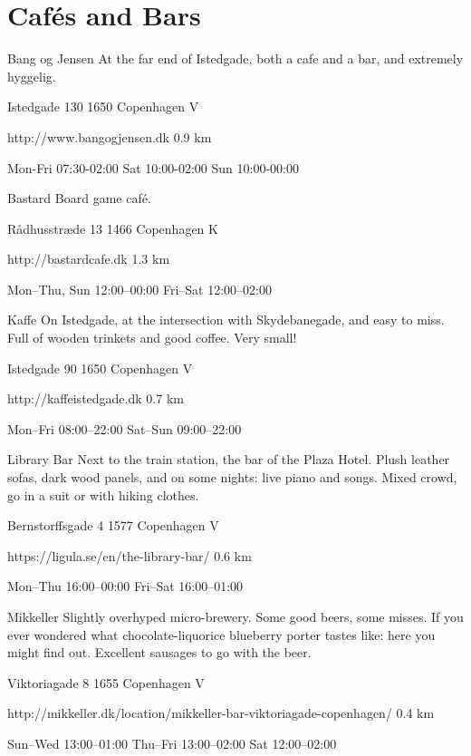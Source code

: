\section{Cafés and Bars}

\begin{fooditem}
{Bang og Jensen}
{At the far end of Istedgade, both a cafe and a bar, and extremely hyggelig.}
{\begin{addr}
{Istedgade 130}
{1650 Copenhagen V}
\end{addr}}
{http://www.bangogjensen.dk}
{0.9 km}
{}
{\begin{ohours}
{Mon-Fri}
{07:30-02:00}
{Sat}
{10:00-02:00}
{Sun}
{10:00-00:00}
{}
{}
\end{ohours}}
\end{fooditem}
\begin{fooditem}
{Bastard}
{Board game café.}
{\begin{addr}
{Rådhusstræde 13}
{1466 Copenhagen K}
\end{addr}}
{http://bastardcafe.dk }
{1.3 km}
{}
{\begin{ohours}
{Mon–Thu, Sun}
{12:00–00:00}
{Fri–Sat}
{12:00–02:00}
{}
{}
{}
{}
\end{ohours}}
\end{fooditem}
\begin{fooditem}
{Kaffe}
{On Istedgade, at the intersection with Skydebanegade, and easy to miss. Full of wooden trinkets and good coffee. Very small!}
{\begin{addr}
{Istedgade 90}
{1650 Copenhagen V}
\end{addr}}
{http://kaffeistedgade.dk}
{0.7 km}
{}
{\begin{ohours}
{Mon–Fri}
{08:00–22:00}
{Sat–Sun}
{09:00–22:00}
{}
{}
{}
{}
\end{ohours}}
\end{fooditem}
\begin{fooditem}
{Library Bar}
{Next to the train station, the bar of the Plaza Hotel. Plush leather sofas, dark wood panels, and on some nights: live piano and songs. Mixed crowd, go in a suit or with hiking clothes.}
{\begin{addr}
{Bernstorffsgade 4}
{1577 Copenhagen V}
\end{addr}}
{https://ligula.se/en/the-library-bar/}
{0.6 km}
{}
{\begin{ohours}
{Mon–Thu}
{16:00–00:00}
{Fri–Sat}
{16:00–01:00}
{}
{}
{}
{}
\end{ohours}}
\end{fooditem}
\begin{fooditem}
{Mikkeller}
{Slightly overhyped micro-brewery. Some good beers, some misses. If you ever wondered what chocolate-liquorice blueberry porter tastes like: here you might find out. Excellent sausages to go with the beer.}
{\begin{addr}
{Viktoriagade 8}
{1655 Copenhagen V}
\end{addr}}
{http://mikkeller.dk/location/mikkeller-bar-viktoriagade-copenhagen/}
{0.4 km}
{}
{\begin{ohours}
{Sun–Wed}
{13:00–01:00}
{Thu–Fri}
{13:00–02:00}
{Sat}
{12:00–02:00}
{}
{}
\end{ohours}}
\end{fooditem}
